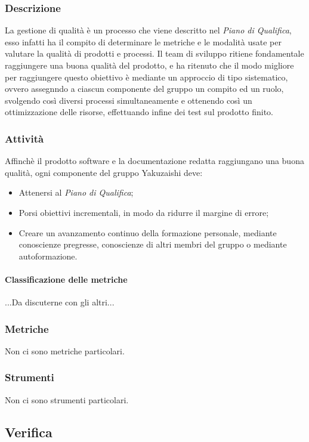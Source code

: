 \subsubsection{Descrizione}
La gestione di qualità è un processo che viene descritto nel \textit{Piano di Qualifica}, esso infatti ha il compito di determinare le metriche e le modalità usate per valutare la qualità di prodotti e processi.
Il team di sviluppo ritiene fondamentale raggiungere una buona qualità del prodotto, e ha ritenuto che il modo migliore per raggiungere questo obiettivo è mediante un approccio di tipo sistematico, ovvero assegnndo a ciascun componente del gruppo un compito ed un ruolo, svolgendo così diversi processi simultaneamente e ottenendo così un ottimizzazione delle risorse, effettuando infine dei test sul prodotto finito. 
\subsubsection{Attività}
Affinchè il prodotto software e la documentazione redatta raggiungano una buona qualità, ogni componente del gruppo Yakuzaishi deve:
\begin{itemize}
    \item Attenersi al \textit{Piano di Qualifica};
    \item Porsi obiettivi incrementali, in modo da ridurre il margine di errore;
    \item Creare un avanzamento continuo della formazione personale, mediante conoscienze pregresse, conoscienze di altri membri del gruppo o mediante autoformazione. 
 \end {itemize}   
\paragraph{Classificazione delle metriche}
...Da discuterne con gli altri...
\subsubsection{Metriche}
Non ci sono metriche particolari.
\subsubsection{Strumenti}
Non ci sono strumenti particolari.



\subsection{Verifica}



